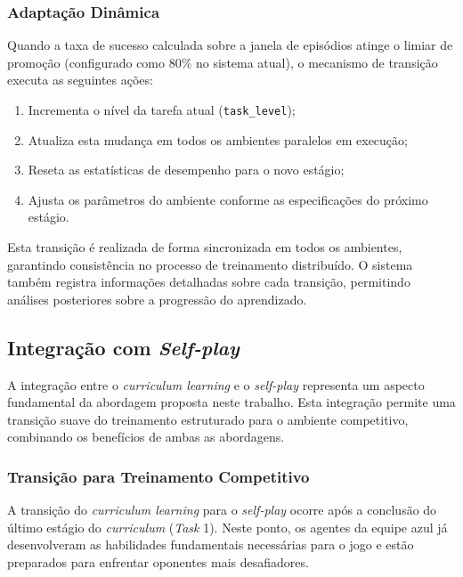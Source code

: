 \subsubsection{Adaptação Dinâmica}

Quando a taxa de sucesso calculada sobre a janela de episódios atinge o limiar de promoção (configurado como 80\% no sistema atual), o mecanismo de transição executa as seguintes ações:

\begin{enumerate}
    \item Incrementa o nível da tarefa atual (\texttt{task\_level});
    \item Atualiza esta mudança em todos os ambientes paralelos em execução;
    \item Reseta as estatísticas de desempenho para o novo estágio;
    \item Ajusta os parâmetros do ambiente conforme as especificações do próximo estágio.
\end{enumerate}

Esta transição é realizada de forma sincronizada em todos os ambientes, garantindo consistência no processo de treinamento distribuído. O sistema também registra informações detalhadas sobre cada transição, permitindo análises posteriores sobre a progressão do aprendizado.

\subsection{Integração com \textit{Self-play}}
\label{subsec:integracao_selfplay}

A integração entre o \textit{curriculum learning} e o \textit{self-play} representa um aspecto fundamental da abordagem proposta neste trabalho. Esta integração permite uma transição suave do treinamento estruturado para o ambiente competitivo, combinando os benefícios de ambas as abordagens.

\subsubsection{Transição para Treinamento Competitivo}

A transição do \textit{curriculum learning} para o \textit{self-play} ocorre após a conclusão do último estágio do \textit{curriculum} (\textit{Task} 1). Neste ponto, os agentes da equipe azul já desenvolveram as habilidades fundamentais necessárias para o jogo e estão preparados para enfrentar oponentes mais desafiadores.


